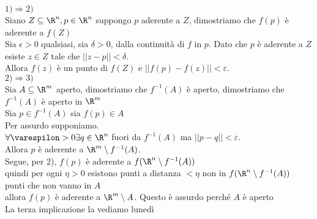 \documentclass{article}
\begin{document}
\begin{dimo}
	$1) \Rightarrow  2)$ \\
	Siano $Z\subseteq\R^n, p\in\R^n$ suppongo $p$ aderente a  $Z$, dimostriamo che  $f(p)$ è aderente a $f(Z)$\\
	Sia  $\epsilon > 0 $ qualsiasi, sia $\delta > 0 $, dalla continuità di  $f$ in $p$. Dato che $p$ è aderente a $Z$ esiste  $z\in Z$  tale che  $||z-p|| < \delta$.\\
	Allora  $f(z)$ è un punto di $f(Z)$ e  $||f(p)-f(z)|| < \varepsilon$.\\
	 $2) \Rightarrow 3)$ \\
	 Sia $A\subseteq \R^m$ aperto, dimostriamo che $f^{-1}(A)$ è aperto, dimostriamo che $f^{-1}(A)$ è aperto in $\R^m$\\
	 Sia  $p\in f^{-1}(A)$ sia $f(p)\in A$\\
	 Per assurdo supponiamo.\\
	 $\forall \varespilon > 0 \exists q\in\R^n$ fuori da  $f^{-1}(A)$ ma  $||p-q|| < \varepsilon$.\\
	 Allora $p$ è aderente a  $\R^m\setminus f^{-1}(A)$.\\
	 Segue, per 2),  $f(p)$ è aderente a $f(\R^n\setminus f^{-1}(A))$\\
	 quindi per ogni  $\eta > 0$ esistono punti a distanza  $< \eta$ non in  $f(\R^n\setminus f^{-1}(A))$ punti che non vanno in $A$\\
	 allora  $f(p)$ è aderente a $\R^m\setminus A$. Questo è assurdo perché  $A$ è aperto\\
	 La terza implicazione la vediamo lunedì
\end{dimo}


\maketitle
	\newpage
\end{document}

